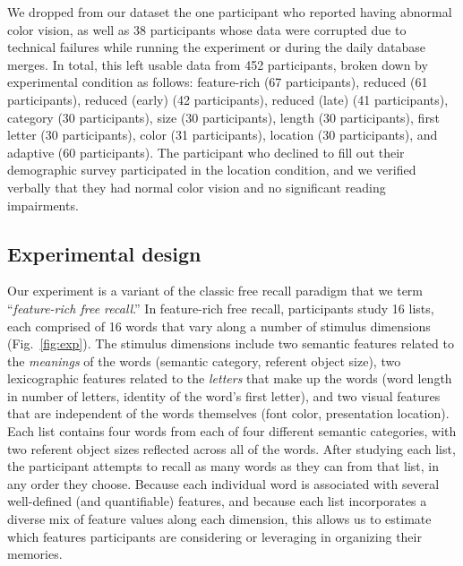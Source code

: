 \documentclass[11pt]{article}
\begin{document}
We dropped from our dataset the one participant who reported having abnormal
color vision, as well as 38 participants whose data were corrupted due to
technical failures while running the experiment or during the daily database
merges. In total, this left usable data from 452 participants, broken down by
experimental condition as follows: feature-rich (67 participants), reduced (61
participants), reduced (early) (42 participants), reduced (late) (41
participants), category (30 participants), size (30 participants), length (30
participants), first letter (30 participants), color (31 participants),
location (30 participants), and adaptive (60 participants). The participant who
declined to fill out their demographic survey participated in the location
condition, and we verified verbally that they had normal color vision and no
significant reading impairments.




\subsection*{Experimental design}

Our experiment is a variant of the classic free recall paradigm that we term
``\textit{feature-rich free recall}.'' In feature-rich free recall,
participants study 16 lists, each comprised of 16 words that vary along a
number of stimulus dimensions (Fig.~\ref{fig:exp}). The stimulus dimensions
include two semantic features related to the \textit{meanings} of the words
(semantic category, referent object size), two lexicographic features related
to the \textit{letters} that make up the words (word length in number of
letters, identity of the word's first letter), and two visual features that are
independent of the words themselves (font color, presentation location). Each
list contains four words from each of four different semantic categories, with
two referent object sizes reflected across all of the words. After studying each list,
the participant attempts to recall as many words as they can from that list, in
any order they choose. Because each individual word is associated with several
well-defined (and quantifiable) features, and because each list incorporates a
diverse mix of feature values along each dimension, this allows us to estimate
which features participants are considering or leveraging in organizing their
memories.
\end{document}
